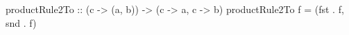 \begin{code}
productRule2To
    :: (c -> (a, b))
    -> (c -> a, c -> b)
productRule2To f = (fst . f, snd . f)
\end{code}
